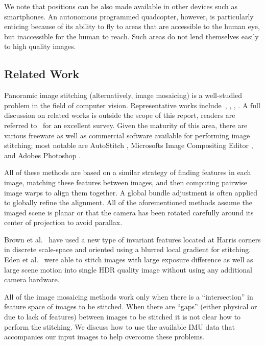 \documentclass[11pt]{article}
\begin{document}
We note that positions can be also made available in other devices
such as smartphones.  An autonomous programmed quadcopter, however, is
particularly enticing because of its ability to fly to areas that are
accessible to the human eye, but inaccessible for the
human to reach.  Such areas do not lend themselves easily to high
quality images.

\subsection{Related Work}
Panoramic image stitching (alternatively, image mosaicing) is a
well-studied problem in the field of computer vision.  Representative
works include~\cite{Milgram1975}, \cite{Milgram1977}, \cite{Capel},
\cite{Szeliski1997} \cite{Brown07} \cite{Brown03}.  A full discussion
on related works is outside the scope of this report, readers are
referred to~\cite{Szeliski05imagealignment} for an excellent survey.
Given the maturity of this area, there are various freeware as well as
commercial software available for performing image stitching; most
notable are AutoStitch \cite{autostitch}, Microsoft\textsc{}s Image
Compositing Editor \cite{ICE}, and Adobe\textsc{}s Photoshop
\cite{photoshop}.

All of these methods are based on a similar strategy of finding
features in each image, matching these features between images, and
then computing pairwise image warps to align them together.  A global
bundle adjustment is often applied to globally refine the alignment.
All of the aforementioned methods assume the imaged scene is planar or
that the camera has been rotated carefully around its center of
projection to avoid parallax.

Brown et al.~\cite{Brown05} have used a new type of invariant features
located at Harris corners in discrete scale-space and oriented using a
blurred local gradient for stitching. Eden et al.~\cite{Eden} were
able to stitch images with large exposure difference as well as large
scene motion into single HDR quality image without using any
additional camera hardware.

All of the image mosaicing methods work only when there is a
``intersection'' in feature space of images to be stitched. When there
are ``gaps'' (either physical or due to lack of features) between
images to be stitched it is not clear how to perform the stitching. We discuss
how to use the available IMU data that accompanies our input images to help
overcome these problems.
\end{document}
